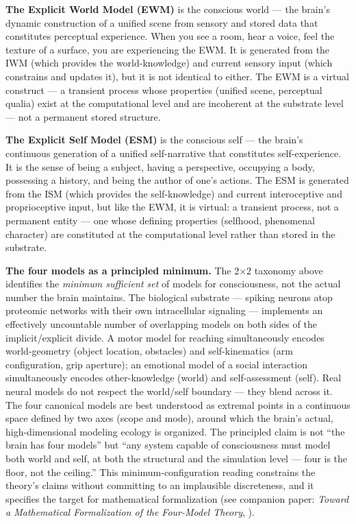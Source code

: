 \documentclass[12pt]{article}
\begin{document}
\textbf{The Explicit World Model (EWM)} is the conscious world --- the brain's dynamic construction of a unified scene from sensory and stored data that constitutes perceptual experience. When you see a room, hear a voice, feel the texture of a surface, you are experiencing the EWM. It is generated from the IWM (which provides the world-knowledge) and current sensory input (which constrains and updates it), but it is not identical to either. The EWM is a virtual construct --- a transient process whose properties (unified scene, perceptual qualia) exist at the computational level and are incoherent at the substrate level --- not a permanent stored structure.

\textbf{The Explicit Self Model (ESM)} is the conscious self --- the brain's continuous generation of a unified self-narrative that constitutes self-experience. It is the sense of being a subject, having a perspective, occupying a body, possessing a history, and being the author of one's actions. The ESM is generated from the ISM (which provides the self-knowledge) and current interoceptive and proprioceptive input, but like the EWM, it is virtual: a transient process, not a permanent entity --- one whose defining properties (selfhood, phenomenal character) are constituted at the computational level rather than stored in the substrate.

\textbf{The four models as a principled minimum.} The 2$\times$2 taxonomy above identifies the \emph{minimum sufficient set} of models for consciousness, not the actual number the brain maintains. The biological substrate --- spiking neurons atop proteomic networks with their own intracellular signaling --- implements an effectively uncountable number of overlapping models on both sides of the implicit/explicit divide. A motor model for reaching simultaneously encodes world-geometry (object location, obstacles) and self-kinematics (arm configuration, grip aperture); an emotional model of a social interaction simultaneously encodes other-knowledge (world) and self-assessment (self). Real neural models do not respect the world/self boundary --- they blend across it. The four canonical models are best understood as extremal points in a continuous space defined by two axes (scope and mode), around which the brain's actual, high-dimensional modeling ecology is organized. The principled claim is not ``the brain has four models'' but ``any system capable of consciousness must model both world and self, at both the structural and the simulation level --- four is the floor, not the ceiling.'' This minimum-configuration reading constrains the theory's claims without committing to an implausible discreteness, and it specifies the target for mathematical formalization (see companion paper: \emph{Toward a Mathematical Formalization of the Four-Model Theory}, \citealp{Gruber2026b}).
\end{document}
